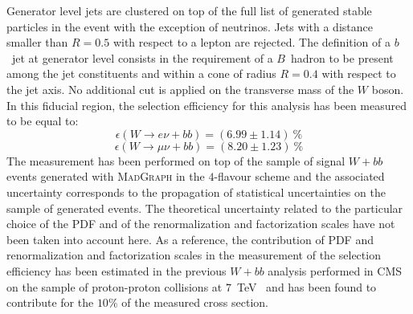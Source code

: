 Generator level jets are clustered on top of the full list of generated
stable particles in the event with the exception of neutrinos.
Jets with a distance smaller than $R = 0.5$ with respect to a
lepton are rejected.
The definition of a
$b$~jet at generator level consists in the requirement of a $B$~hadron to be
present among the jet constituents and within a cone of radius $R = 0.4$
with respect to the jet axis.
No additional cut is applied on the transverse mass of the $W$ boson.
In this fiducial region, the selection efficiency for this analysis has
been measured to be equal to:
$$\epsilon (W \rightarrow e \nu + bb) = (6.99 \pm 1.14) ~ \% $$
$$\epsilon (W \rightarrow \mu \nu + bb) = (8.20 \pm 1.23) ~ \% $$
The measurement has been performed on top of the sample of signal $W + bb$ events
generated with \textsc{MadGraph} in the $4$-flavour scheme 
and the associated uncertainty corresponds to the propagation of statistical
uncertainties on the sample of generated events.
The theoretical uncertainty related to the particular choice of
the PDF and of the renormalization and factorization scales have not been taken into account here.
As a reference, the contribution of PDF and
renormalization and factorization scales in the
measurement of the selection efficiency has been
estimated in the previous $W + bb$ analysis performed
in CMS on the sample of proton-proton collisions at $7$~TeV~\cite{Chatrchyan:2013uza} and
has been found to contribute for the $10\%$ of the measured cross section.


